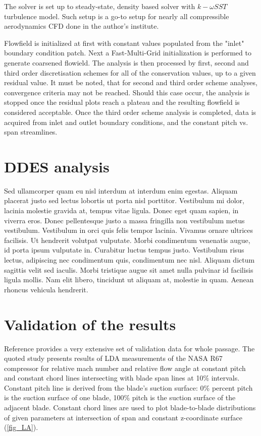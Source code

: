 The solver is set up to steady-state, density based solver with $k-\omega SST$ turbulence model. Such setup is a go-to setup for nearly all compressible aerodynamics CFD done in the author's institute.

Flowfield is initialized at first with constant values populated from the "inlet" boundary condition patch. Next a Fast-Multi-Grid initialization is performed to generate coarsened flowield. The analysis is then processed by first, second and third order discretisation schemes for all of the conservation values, up to a given residual value. It must be noted, that for second and third order scheme analyses, convergence criteria may not be reached. Should this case occur, the analysis is stopped once the residual plots reach a plateau and the resulting flowfield is considered acceptable. Once the third order scheme analysis is completed, data is acquired from inlet and outlet boundary conditions, and the constant pitch vs. span streamlines.


\section{DDES analysis}

Sed ullamcorper quam eu nisl interdum at interdum enim egestas. Aliquam placerat justo sed lectus lobortis ut porta nisl porttitor. Vestibulum mi dolor, lacinia molestie gravida at, tempus vitae ligula. Donec eget quam sapien, in viverra eros. Donec pellentesque justo a massa fringilla non vestibulum metus vestibulum. Vestibulum in orci quis felis tempor lacinia. Vivamus ornare ultrices facilisis. Ut hendrerit volutpat vulputate. Morbi condimentum venenatis augue, id porta ipsum vulputate in. Curabitur luctus tempus justo. Vestibulum risus lectus, adipiscing nec condimentum quis, condimentum nec nisl. Aliquam dictum sagittis velit sed iaculis. Morbi tristique augue sit amet nulla pulvinar id facilisis ligula mollis. Nam elit libero, tincidunt ut aliquam at, molestie in quam. Aenean rhoncus vehicula hendrerit.

\section{Validation of the results}
Reference \citep{r67laser} provides a very extensive set of validation data for whole passage. The quoted study presents results of LDA measurements of the NASA R67 compressor for relative mach number and relative flow angle at constant pitch and constant chord lines intersecting with blade span lines at 10\% intervals. Constant pitch line is derived from the blade's suction surface: 0\% percent pitch is the suction surface of one blade, 100\% pitch is the suction surface of the adjacent blade. Constant chord lines are used to plot blade-to-blade distributions of given parameters at intersection of span and constant z-coordinate surface (\ref{fig_LA}).


